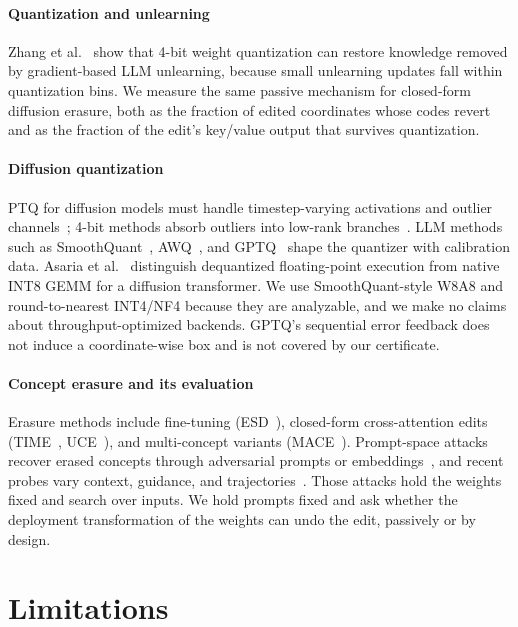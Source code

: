 \documentclass[conference]{IEEEtran}
\begin{document}
\paragraph{Quantization and unlearning}
Zhang et al.~\cite{zhang2025} show that 4-bit weight quantization can restore
knowledge removed by gradient-based LLM unlearning, because small unlearning updates
fall within quantization bins. We measure the same passive mechanism for closed-form
diffusion erasure, both as the fraction of edited coordinates whose codes revert and as
the fraction of the edit's key/value output that survives quantization.

\paragraph{Diffusion quantization}
PTQ for diffusion models must handle timestep-varying activations and outlier
channels~\cite{ptq4dm,qdiffusion}; 4-bit methods absorb outliers into low-rank
branches~\cite{svdquant}. LLM methods such as SmoothQuant~\cite{smoothquant},
AWQ~\cite{awq}, and GPTQ~\cite{gptq} shape the quantizer with calibration data.
Asaria et al.~\cite{asaria2026} distinguish dequantized floating-point execution
from native INT8 GEMM for a diffusion transformer. We use SmoothQuant-style W8A8 and
round-to-nearest INT4/NF4 because they are analyzable, and we make no claims about throughput-optimized
backends. GPTQ's sequential error feedback does not induce a coordinate-wise box and
is not covered by our certificate.

\paragraph{Concept erasure and its evaluation}
Erasure methods include fine-tuning (ESD~\cite{esd}), closed-form cross-attention
edits (TIME~\cite{time}, UCE~\cite{uce}), and multi-concept variants
(MACE~\cite{mace}). Prompt-space attacks recover erased concepts through adversarial
prompts or embeddings~\cite{pham2023,ringabell,unlearndiffatk}, and recent probes
vary context, guidance, and trajectories~\cite{lu2025}. Those attacks hold the
weights fixed and search over inputs. We hold prompts fixed and ask whether the
deployment transformation of the weights can undo the edit, passively or by design.
\section{Limitations}
\label{sec:limits}
\end{document}
